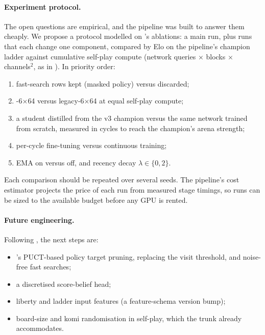 \paragraph{Experiment protocol.}
The open questions are empirical, and the pipeline was built to answer them cheaply. We
propose a protocol modelled on \citeauthor{wu2019accelerating}'s ablations: a main run,
plus runs that each change one component, compared by Elo on the pipeline's champion
ladder against cumulative self-play compute (network queries $\times$ blocks $\times$
channels$^2$, as in \citet{wu2019accelerating}). In priority order:
\begin{enumerate}
  \item fast-search rows kept (masked policy) versus discarded;
  \item {}-6$\times$64 versus legacy-6$\times$64 at equal self-play compute;
  \item a  student distilled from the v3 champion versus the same network
        trained from scratch, measured in cycles to reach the champion's arena strength;
  \item per-cycle fine-tuning versus continuous training;
  \item EMA on versus off, and recency decay $\lambda\in\{0,2\}$.
\end{enumerate}
Each comparison should be repeated over several seeds. The pipeline's cost estimator
projects the price of each run from measured stage timings, so runs can be sized to the
available budget before any GPU is rented.

\paragraph{Future engineering.}
Following \katago{}, the next steps are:
\begin{itemize}
  \item \katago{}'s PUCT-based policy target pruning, replacing the visit threshold, and
        noise-free fast searches;
  \item a discretised score-belief head;
  \item liberty and ladder input features (a feature-schema version bump);
  \item board-size and komi randomisation in self-play, which the  trunk
        already accommodates.
\end{itemize}
